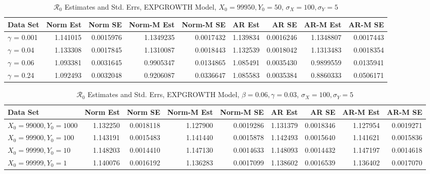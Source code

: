 \documentclass[12pt]{article}
\newcommand{\rr}{\ensuremath{\mathcal{R}_0}}
\begin{document}
\begin{table}
	
	\caption{\label{tab:}$\rr$ Estimates and Std. Errs, EXPGROWTH Model,
		$X_0 = 99950, Y_0 = 50$, $\sigma_X = 100, \sigma_Y = 5$}
	\centering
	\begin{tabular}[t]{l|r|r|r|r|r|r|r|r}
		\hline
		Data Set & Norm Est & Norm SE & Norm-M Est & Norm-M SE & AR Est & AR SE & AR-M Est & AR-M SE\\
		\hline
		$\gamma$ = 0.001 & 1.141015 & 0.0015976 & 1.1349235 & 0.0017432 & 1.139834 & 0.0016246 & 1.1348807 & 0.0017443\\
		\hline
		$\gamma$ = 0.04 & 1.133308 & 0.0017845 & 1.1310087 & 0.0018443 & 1.132539 & 0.0018042 & 1.1313483 & 0.0018354\\
		\hline
		$\gamma$ = 0.06 & 1.093381 & 0.0031645 & 0.9905347 & 0.0134865 & 1.085491 & 0.0035430 & 0.9899559 & 0.0135941\\
		\hline
		$\gamma$ = 0.24 & 1.092493 & 0.0032048 & 0.9206087 & 0.0336647 & 1.085583 & 0.0035384 & 0.8860333 & 0.0506171\\
		\hline
	\end{tabular}
\end{table}

\begin{table}
	
	\caption{\label{tab:}$\rr$ Estimates and Std. Errs, EXPGROWTH Model,
		$\beta = 0.06, \gamma = 0.03$, $\sigma_X = 100, \sigma_Y = 5$}
	\centering
	\begin{tabular}[t]{l|r|r|r|r|r|r|r|r}
		\hline
		Data Set & Norm Est & Norm SE & Norm-M Est & Norm-M SE & AR Est & AR SE & AR-M Est & AR-M SE\\
		\hline
		$X_0 = 99000, Y_0 = 1000$ & 1.132250 & 0.0018118 & 1.127900 & 0.0019286 & 1.131379 & 0.0018346 & 1.127954 & 0.0019271\\
		\hline
		$X_0 = 99900, Y_0 = 100$ & 1.143191 & 0.0015483 & 1.141440 & 0.0015878 & 1.142493 & 0.0015640 & 1.141621 & 0.0015836\\
		\hline
		$X_0 = 99990, Y_0 = 10$ & 1.148203 & 0.0014410 & 1.147130 & 0.0014633 & 1.148093 & 0.0014432 & 1.147197 & 0.0014618\\
		\hline
		$X_0 = 99999, Y_0 = 1$ & 1.140076 & 0.0016192 & 1.136283 & 0.0017099 & 1.138602 & 0.0016539 & 1.136402 & 0.0017070\\
		\hline
	\end{tabular}
\end{table}
\end{document}
